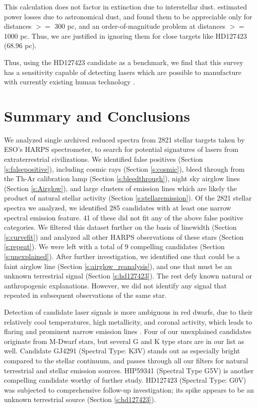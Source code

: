 \documentclass[linenumbers]{aastex631}
\begin{document}
This calculation does not factor in extinction due to interstellar dust.  \cite{Hippke_2018} estimated power losses due to astronomical dust, and found them to be appreciable only for distances $>=$ 300 pc, and an order-of-magnitude problem at distances $>=$ 1000 pc.  Thus, we are justified in ignoring them for close targets like HD127423 (68.96 pc).

Thus, using the HD127423 candidate as a benchmark, we find that this survey has a sensitivity capable of detecting lasers which are possible to manufacture with currently existing human technology \citep{Lander1997ContinuouswaveCD}.

\section{Summary and Conclusions}
We analyzed single archived reduced spectra from 2821 stellar targets taken by ESO’s HARPS spectrometer, to search for potential signatures of lasers from extraterrestrial civilizations. We identified false positives (Section \ref{s:falsepositive}), including cosmic rays (Section \ref{s:cosmic}), bleed through from the Th-Ar calibration lamp (Section \ref{s:bleedthrough}), night sky airglow lines (Section \ref{s:Airglow}), and large clusters of emission lines which are likely the product of natural stellar activity (Section \ref{s:stellaremission}). Of the 2821 stellar spectra we analyzed, we identified 285 candidates with at least one narrow spectral emission feature.  41 of these did not fit any of the above false positive categories. We filtered this dataset further on the basis of linewidth (Section \ref{s:curvefit}) and analyzed all other HARPS observations of these stars (Section \ref{s:repeat}). We were left with a total of 9 compelling candidates (Section \ref{s:unexplained}). After further investigation, we identified one that could be a faint airglow line (Section \ref{s:airglow_reanalysis}), and one that must be an unknown terrestrial signal (Section \ref{s:hd127423}). The rest defy known natural or anthropogenic explanations.  However, we did not identify any signal that repeated in subsequent observations of the same star.

Detection of candidate laser signals is more ambiguous in red dwarfs, due to their relatively cool temperatures, high metallicity, and coronal activity, which leads to flaring and prominent narrow emission lines \citep{Marcy_2021}. Four of our unexplained candidates originate from M-Dwarf stars, but several G and K type stars are in our list as well.  Candidate GJ4291 (Spectral Type: K3V) stands out as especially bright compared to the stellar continuum, and passes through all our filters for natural terrestrial and stellar emission sources.  HIP59341 (Spectral Type G5V) is another compelling candidate worthy of further study.  HD127423 (Spectral Type: G0V) was subjected to comprehensive follow-up investigation; its spike appears to be an unknown terrestrial source (Section \ref{s:hd127423}). 
\end{document}

